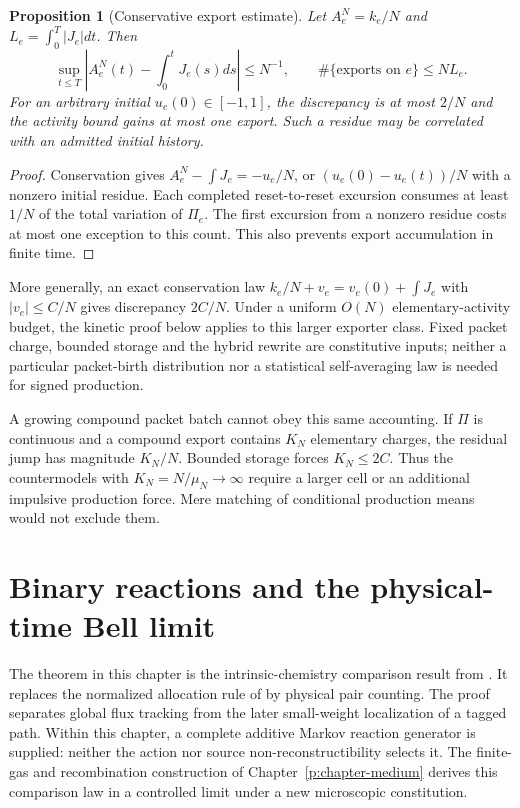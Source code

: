 \documentclass[11pt,oneside,openany]{book}
\newtheorem{proposition}[theorem]{Proposition}
\theoremstyle{definition}
\theoremstyle{remark}\newtheorem{remark}[theorem]{Remark}
\begin{document}
\begin{proposition}[Conservative export estimate]\label{kin:export}
Let $A_e^N=k_e/N$ and $L_e=\int_0^T|J_e|dt$. Then
\begin{equation}
 \sup_{t\le T}\left|A_e^N(t)-\int_0^tJ_e(s)ds\right|\le N^{-1},
 \qquad \#\{\text{exports on }e\}\le NL_e.
 \label{kin:exportbound}
\end{equation}
For an arbitrary initial $u_e(0)\in[-1,1]$, the discrepancy is at most
$2/N$ and the activity bound gains at most one export. Such a residue may
be correlated with an admitted initial history.
\end{proposition}
\begin{proof}
Conservation gives $A_e^N-\int J_e=-u_e/N$, or
$(u_e(0)-u_e(t))/N$ with a nonzero initial residue. Each completed
reset-to-reset excursion consumes at least $1/N$ of the total variation
of $\Pi_e$. The first excursion from a nonzero residue costs at most one
exception to this count. This also prevents export accumulation in finite
time.
\end{proof}
More generally, an exact conservation law
$k_e/N+v_e=v_e(0)+\int J_e$ with $|v_e|\le C/N$ gives discrepancy
$2C/N$. Under a uniform $O(N)$ elementary-activity budget, the kinetic
proof below applies to this larger exporter class. Fixed packet charge,
bounded storage and the hybrid rewrite are constitutive inputs; neither
a particular packet-birth distribution nor a statistical self-averaging
law is needed for signed production.

A growing compound packet batch cannot obey this same accounting. If
$\Pi$ is continuous and a compound export contains $K_N$ elementary
charges, the residual jump has magnitude $K_N/N$. Bounded storage forces
$K_N\le2C$. Thus the countermodels with $K_N=N/\mu_N\to\infty$ require a
larger cell or an additional impulsive production force. Mere matching of
conditional production means would not exclude them.

\chapter{Binary reactions and the physical-time Bell limit}
\label{kin:limit}

The theorem in this chapter is the intrinsic-chemistry comparison result
from \cite{M01}. It replaces the normalized allocation rule of \cite{M02}
by physical pair counting. The proof separates global flux tracking from
the later small-weight localization of a tagged path. Within this chapter,
a complete additive Markov reaction generator is supplied: neither the
action nor source non-reconstructibility selects it. The finite-gas and
recombination construction of Chapter~\ref{p:chapter-medium} derives this
comparison law in a controlled limit under a new microscopic constitution.
\end{document}
